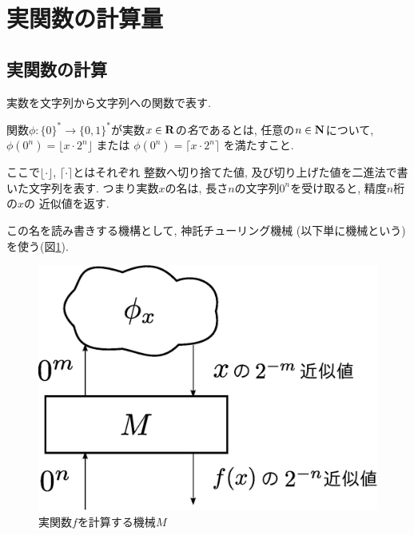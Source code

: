 \section{実関数の計算量}
\label{section: preliminaries}

\subsection{実関数の計算}

実数を文字列から文字列への関数で表す.
 \begin{definition}
  関数$\phi \colon \{0\} ^* \to \{0, 1\}^*$が実数$x \in \mathbf R$の\emph{名}であるとは,
任意の$n \in \mathbf N$について, 
  $\phi(0^n) = \lfloor x \cdot 2^n \rfloor$ または
  $\phi(0^n) = \lceil x \cdot 2^n \rceil$ を満たすこと.
 \end{definition}
ここで$\lfloor \cdot \rfloor$, $\lceil \cdot \rceil$とはそれぞれ
整数へ切り捨てた値, 及び切り上げた値を二進法で書いた文字列を表す.
つまり実数$x$の名は, 
長さ$n$の文字列$0 ^n$を受け取ると, 精度$n$桁の$x$の
近似値を返す.

この名を読み書きする機構として, 
神託チューリング機械 (以下単に機械という) を使う(図\ref{fig:model-of-function}).

 \begin{figure}
  \begin{center}
   \includegraphics[height=0.15\textheight]{image/model-of-function.eps}
  \end{center}
  \caption{実関数$f$を計算する機械$M$}
  \label{fig:model-of-function}
 \end{figure}


